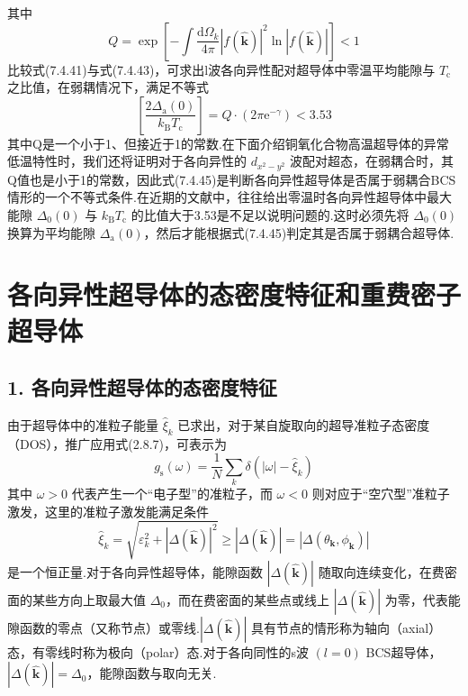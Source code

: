 其中
\begin{equation}
  Q=\exp\left[-\int\frac{\mathrm{d}\Omega_{k}}{4\pi}
  \left|f(\hat{\boldsymbol{k}})\right|^{2}\ln\left|f(\hat{\boldsymbol{k}})\right|\right]<1
\end{equation}
比较式(7.4.41)与式(7.4.43)，可求出l波各向异性配对超导体中零温平均能隙与 $T_{\mathrm{c}}$ 之比值，在弱耦情况下，满足不等式
\begin{equation}
  \left[\frac{2\Delta_{\mathrm{a}}(0)}{k_{\mathrm{B}}T_{\mathrm{c}}}\right]=Q\cdot\left(2\pi\mathrm{e}^{-\gamma}\right)<3.53
\end{equation}
其中Q是一个小于1、但接近于1的常数.在下面介绍铜氧化合物高温超导体的异常低温特性时，我们还将证明对于各向异性的 $d_{x^{2}-y^{2}}$ 波配对超态，在弱耦合时，其Q值也是小于1的常数，因此式(7.4.45)是判断各向异性超导体是否属于弱耦合BCS情形的一个不等式条件.在近期的文献中，往往给出零温时各向异性超导体中最大能隙 $\Delta_{0}(0)$ 与 $k_{\mathrm{B}}T_{\mathrm{c}}$ 的比值大于3.53是不足以说明问题的.这时必须先将 $\Delta_{0}(0)$ 换算为平均能隙 $\Delta_{\mathrm{a}}(0)$，然后才能根据式(7.4.45)判定其是否属于弱耦合超导体.

\section{各向异性超导体的态密度特征和重费密子超导体}

\subsection*{1. 各向异性超导体的态密度特征}

由于超导体中的准粒子能量 $\hat{\xi}_{k}$ 已求出，对于某自旋取向的超导准粒子态密度（DOS），推广应用式(2.8.7)，可表示为
\begin{equation}
  g_{\mathrm{s}}(\omega)=\frac{1}{N}\sum_{k}\delta\left(\left|\omega\right|-\hat{\xi}_{k}\right)
\end{equation}
其中 $\omega>0$ 代表产生一个“电子型”的准粒子，而 $\omega<0$ 则对应于“空穴型”准粒子激发，这里的准粒子激发能满足条件
\begin{equation}
  \hat{\xi}_{k}=\sqrt{\varepsilon_{k}^{2}+\left|\Delta(\hat{\boldsymbol{k}})\right|^{2}}
  \geqslant\left|\Delta(\hat{\boldsymbol{k}})\right|
  =\left|\Delta\left(\theta_{\boldsymbol{k}},\phi_{\boldsymbol{k}}\right)\right|
\end{equation}
是一个恒正量.对于各向异性超导体，能隙函数 $\left|\Delta(\hat{\boldsymbol{k}})\right|$ 随取向连续变化，在费密面的某些方向上取最大值 $\Delta_{0}$，而在费密面的某些点或线上 $\left|\Delta(\hat{\boldsymbol{k}})\right|$ 为零，代表能隙函数的零点（又称节点）或零线.$\left|\Delta(\hat{\boldsymbol{k}})\right|$ 具有节点的情形称为轴向（axial）态，有零线时称为极向（polar）态.对于各向同性的s波 $\left(l=0\right)$ BCS超导体，$\left|\Delta(\hat{\boldsymbol{k}})\right|=\Delta_{0}$，能隙函数与取向无关.

